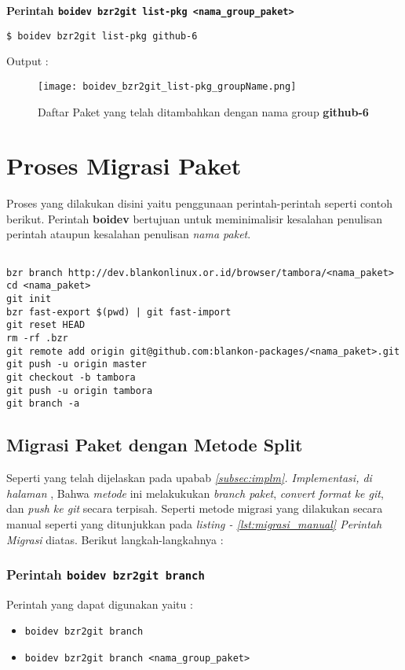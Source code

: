 {\noindent
\textbf{Perintah {\small \texttt{boidev bzr2git list-pkg <nama\_group\_paket>}}}

\begin{lstlisting}[language=ShellBash]
$ boidev bzr2git list-pkg github-6
\end{lstlisting}

\noindent
Output :
\begin{figure}[H]
	\centering
	\texttt{[image: boidev\_bzr2git\_list-pkg\_groupName.png]}
	\caption{Daftar Paket yang telah ditambahkan dengan nama group \textbf{github-6}}
	\label{fig:bab2_list-pkg_bygrp}
\end{figure}

\section{Proses Migrasi Paket}
\label{sec:pre_impl_pros_mig}
\noindent
Proses yang dilakukan disini yaitu penggunaan perintah-perintah seperti contoh berikut. Perintah \textbf{boidev} bertujuan untuk meminimalisir kesalahan penulisan perintah ataupun kesalahan penulisan \textit{nama paket}.

\begin{lstlisting}[language=ShellBash2, caption=Perintah Migrasi, label=lst:migrasi_manual]

bzr branch http://dev.blankonlinux.or.id/browser/tambora/<nama_paket>
cd <nama_paket>
git init
bzr fast-export $(pwd) | git fast-import
git reset HEAD
rm -rf .bzr
git remote add origin git@github.com:blankon-packages/<nama_paket>.git
git push -u origin master
git checkout -b tambora
git push -u origin tambora
git branch -a
\end{lstlisting}

\subsection{Migrasi Paket dengan \textbf{Metode Split}}
\label{implm_4}
\noindent
Seperti yang telah dijelaskan pada upabab \textit{\ref{subsec:implm}. Implementasi, di halaman \pageref{itm:metode_split}}, Bahwa \textit{metode} ini melakukukan \textit{branch paket}, \textit{convert format ke git}, dan \textit{push ke git} secara terpisah. Seperti metode migrasi yang dilakukan secara manual seperti yang ditunjukkan pada \textit{listing - \ref{lst:migrasi_manual} Perintah Migrasi} diatas. Berikut langkah-langkahnya :

\subsubsection{Perintah {\small \texttt{boidev bzr2git branch}}}
\noindent
Perintah yang dapat digunakan yaitu :
\begin{itemize}
	\item {\small \texttt{boidev bzr2git branch}}
	\item {\small \texttt{boidev bzr2git branch <nama\_group\_paket>}}
\end{itemize}

}
